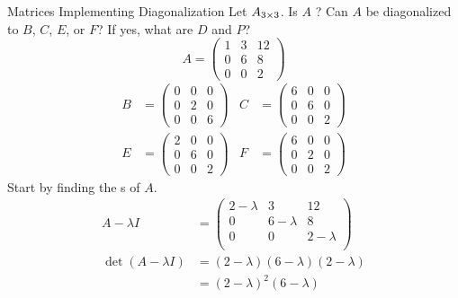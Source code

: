 \begin{example}{Matrices Implementing Diagonalization}
  Let $A_{3 \times 3}$.
  Is $A$ ?
  Can $A$ be diagonalized to $B$, $C$, $E$, or $F$?
  If yes, what are $D$ and $P$?
  \begin{equation*}
    A =
        \begin{pmatrix}
          1 & 3 & 12 \\
          0 & 6 & 8 \\
          0 & 0 & 2
        \end{pmatrix}
  \end{equation*}
  \begin{align*}
    B &=
        \begin{pmatrix}
          0 & 0 & 0 \\
          0 & 2 & 0 \\
          0 & 0 & 6
        \end{pmatrix} &
    C &=
        \begin{pmatrix}
          6 & 0 & 0 \\
          0 & 6 & 0 \\
          0 & 0 & 2
        \end{pmatrix} \\
    E &=
        \begin{pmatrix}
          2 & 0 & 0 \\
          0 & 6 & 0 \\
          0 & 0 & 2
        \end{pmatrix} &
    F &=
        \begin{pmatrix}
          6 & 0 & 0 \\
          0 & 2 & 0 \\
          0 & 0 & 2
        \end{pmatrix}
  \end{align*}
  \tcblower{}
  Start by finding the s of $A$.
  \begin{align*}
    A - \lambda I &=
                    \begin{pmatrix}
                      2 - \lambda & 3 & 12 \\
                      0 & 6 - \lambda & 8 \\
                      0 & 0 & 2 - \lambda \\
                    \end{pmatrix} \\
    \det(A - \lambda I) &= (2 - \lambda) (6 - \lambda) (2 - \lambda) \\
    &= {(2 - \lambda)}^{2} (6 - \lambda)
  \end{align*}


\end{example}
